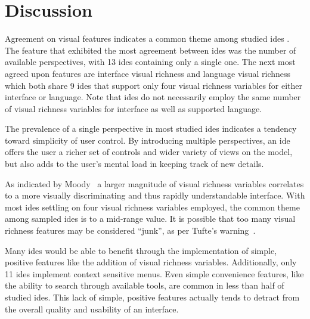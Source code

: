 \section{Discussion}
\label{sec:discussion}


Agreement on visual features indicates a common theme among studied
\acp{ide} . The feature that exhibited the most agreement between \acp{ide}
was the number of available perspectives, with 13 \acp{ide} containing only
a single one. The next most agreed upon features are interface visual
richness and language visual richness which both share 9 \acp{ide} that
support only four visual richness variables for either interface or
language. Note that \acp{ide} do not necessarily employ the same number of
visual richness variables for interface as well as supported language.

The prevalence of a single perspective in most studied \acp{ide} indicates
a tendency toward simplicity of user control. By introducing multiple
perspectives, an \ac{ide} offers the user a richer set of controls and
wider variety of views on the model, but also adds to the user's mental
load in keeping track of new details.

As indicated by Moody~\cite{moody2009} a larger magnitude of visual
richness variables correlates to a more visually discriminating and thus
rapidly understandable interface. With most \acp{ide} settling on four
visual richness variables employed, the common theme among sampled
\acp{ide} is to a mid-range value. It is possible that too many visual
richness features may be considered ``junk'', as per Tufte's
warning~\cite{Tufte2001}.

Many \acp{ide} would be able to benefit through the implementation of
simple, positive features like the addition of visual richness variables.
Additionally, only 11 \acp{ide} implement context sensitive menus. Even
simple convenience features, like the ability to search through available
tools, are common in less than half of studied \acp{ide}. This lack of
simple, positive features actually tends to detract from the overall
quality and usability of an interface.

